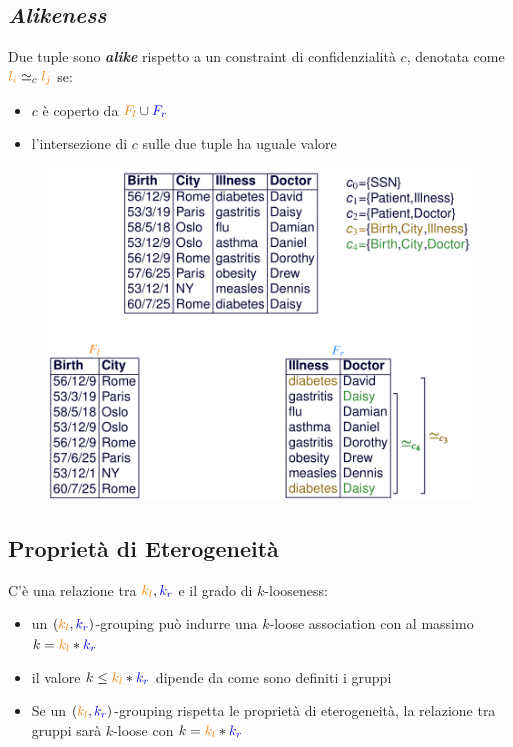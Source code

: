\documentclass{report}
\begin{document}
\subsection{\textit{Alikeness}}
Due tuple sono \textit{\textbf{alike}} rispetto a un constraint
di confidenzialità $c$, denotata come $\textcolor{orange}{l_i} \simeq_c \textcolor{orange}{l_j}$ se:
\begin{itemize}
    \item $c$ è coperto da $\textcolor{orange}{F_l} \cup \textcolor{blue}{F_r}$
    \item l'intersezione di $c$ sulle due tuple ha uguale valore
\end{itemize}

\begin{figure}[ht]
    \centering
    \includegraphics[width=0.8\linewidth]{images/publ-obf-ass/alike.png}
\end{figure}
 

\newpage
\subsection{Proprietà di Eterogeneità}
C'è una relazione tra $\textcolor{orange}{k_l}, \textcolor{blue}{k_r}$ e 
il grado di $k$-looseness:
\begin{itemize}
    \item un $(\textcolor{orange}{k_l}, \textcolor{blue}{k_r})$-grouping può indurre 
    una $k$-loose association con al massimo $k = \textcolor{orange}{k_l}*\textcolor{blue}{k_r}$
    \item il valore $k \leq \textcolor{orange}{k_l}*\textcolor{blue}{k_r}$ dipende da come sono definiti i gruppi
    \item Se un $(\textcolor{orange}{k_l}, \textcolor{blue}{k_r})$-grouping rispetta le proprietà di eterogeneità, 
    la relazione tra gruppi sarà $k$-loose con $k = \textcolor{orange}{k_l}*\textcolor{blue}{k_r}$
\end{itemize}
\end{document}
